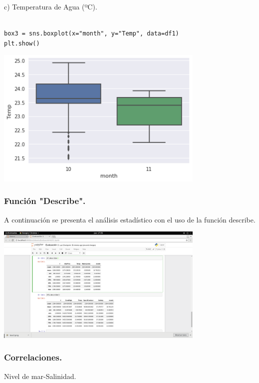 \documentclass{article} %
\begin{document}
c) Temperatura de Agua (ºC).

\begin{verbatim} 

box3 = sns.boxplot(x="month", y="Temp", data=df1)
plt.show()

\end{verbatim}

 \begin{center}
 	\includegraphics[width=10cm]{box3.png}
 \end{center}
 
 
\subsubsection{Función "Describe".}

A continuación se presenta el análisis estadístico con el uso de la función describe.


 \begin{center}
 	\includegraphics[width=10cm]{describe.png}
 \end{center}


\subsubsection{Correlaciones.}

\hspace{0.45 cm}Nivel de mar-Salinidad.
\end{document}
